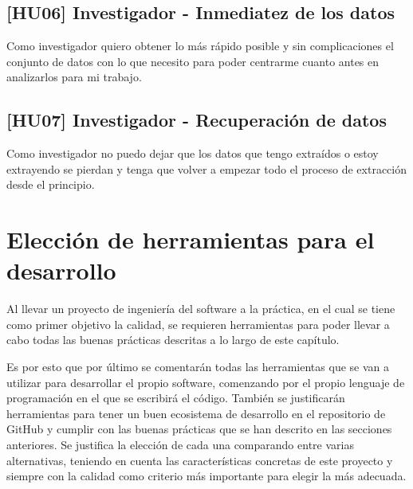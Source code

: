\subsection{[HU06] Investigador - Inmediatez de los datos}
Como investigador quiero obtener lo más rápido posible y sin complicaciones el
conjunto de datos con lo que necesito para poder centrarme cuanto antes en
analizarlos para mi trabajo.

\subsection{[HU07] Investigador - Recuperación de datos}
Como investigador no puedo dejar que los datos que tengo extraídos o estoy
extrayendo se pierdan y tenga que volver a empezar todo el proceso de extracción
desde el principio.



\section{Elección de herramientas para el desarrollo}
Al llevar un proyecto de ingeniería del software a la práctica, en el cual se
tiene como primer objetivo la calidad, se requieren herramientas para poder
llevar a cabo todas las buenas prácticas descritas a lo largo de este capítulo. 

Es por esto que por último se comentarán todas las herramientas que se van a
utilizar para desarrollar el propio software, comenzando por el propio lenguaje
de programación en el que se escribirá el código. También se justificarán
herramientas para tener un buen ecosistema de desarrollo en el repositorio de
GitHub y cumplir con las buenas prácticas que se han descrito en las secciones
anteriores. Se justifica la elección de cada una comparando entre varias
alternativas, teniendo en cuenta las características concretas de este proyecto
y siempre con la calidad como criterio más importante para elegir la más
adecuada.

